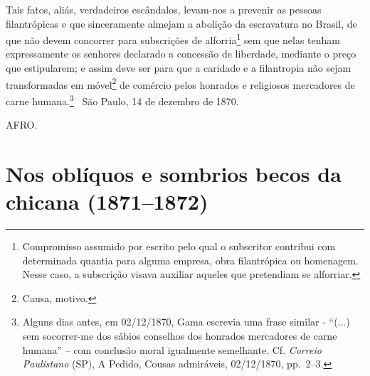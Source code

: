 {Tais fatos, aliás, verdadeiros escândalos, levam-nos a prevenir as
pessoas filantrópicas e que sinceramente almejam a abolição da
escravatura no Brasil, de que não devem concorrer para subscrições de
alforria\footnote{ Compromisso assumido por escrito pelo qual o
  subscritor contribui com determinada quantia para alguma empresa, obra
  filantrópica ou homenagem. Nesse caso, a subscrição visava auxiliar
  aqueles que pretendiam se alforriar.} sem que nelas tenham
expressamente os senhores declarado a concessão de liberdade, mediante o
preço que estipularem; e assim deve ser para que a caridade e a
filantropia não sejam transformadas em móvel\footnote{ Causa, motivo.}
de comércio pelos honrados e religiosos mercadores de carne
humana.\footnote{ Alguns dias antes, em 02/12/1870, Gama escrevia uma
  frase similar - ``(...) sem socorrer-me dos sábios conselhos dos
  honrados mercadores de carne humana'' -- com conclusão moral igualmente
  semelhante. Cf. \emph{Correio Paulistano} (SP), A Pedido, Cousas
  admiráveis, 02/12/1870, pp.~2--3.}
\
São Paulo, 14 de dezembro de 1870.

AFRO.

\part{Nos oblíquos e sombrios becos da chicana (1871--1872)}

}
